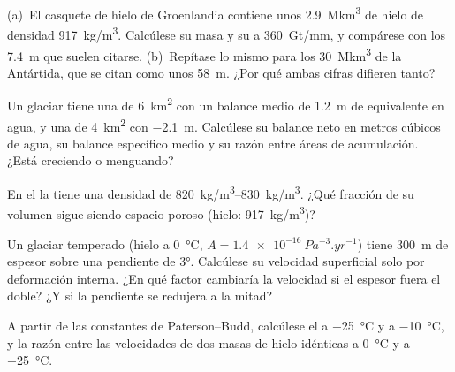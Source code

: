 \begin{exercise}[$\star$]\label{exo:b3:glaciology:2}
(a)~El casquete de hielo de Groenlandia contiene unos \qty{2.9}{\mega km^3} de hielo de
densidad \qty{917}{kg/m^3}. Calcúlese su masa y su  a
\qty{360}{Gt/mm}, y compárese con los \qty{7.4}{m} que suelen citarse.
(b)~Repítase lo mismo para los \qty{30}{\mega km^3} de la Antártida, que se citan como unos
\qty{58}{m}. ¿Por qué ambas cifras difieren tanto?
\end{exercise}

\begin{exercise}[$\star$]\label{exo:b3:glaciology:3}
Un glaciar tiene una  de \qty{6}{km^2} con un balance medio de
\qty{+1.2}{m} de equivalente en agua, y una  de \qty{4}{km^2} con
\qty{-2.1}{m}. Calcúlese su balance neto en metros cúbicos de agua, su balance
específico medio y su razón entre áreas de acumulación. ¿Está creciendo o
menguando?
\end{exercise}

\begin{exercise}[$\star$]\label{exo:b3:glaciology:4}
En el  la  tiene una densidad de \qtyrange{820}{830}{kg/m^3}.
¿Qué fracción de su volumen sigue siendo espacio poroso (hielo:
\qty{917}{kg/m^3})?
\end{exercise}

\begin{exercise}[$\star\star$]\label{exo:b3:glaciology:5}
Un glaciar temperado (hielo a \qty{0}{\celsius}, $A =
\qty{1.4e-16}{Pa^{-3}.yr^{-1}}$) tiene \qty{300}{m} de espesor sobre una pendiente de
\ang{3}. Calcúlese su velocidad superficial solo por deformación interna. ¿En qué
factor cambiaría la velocidad si el espesor fuera el doble? ¿Y si la pendiente
se redujera a la mitad?
\end{exercise}

\begin{exercise}[$\star\star$]\label{exo:b3:glaciology:6}
A partir de las constantes de Paterson--Budd, calcúlese el  a
\qty{-25}{\celsius} y a \qty{-10}{\celsius}, y la razón entre las velocidades de
dos masas de hielo idénticas a \qty{0}{\celsius} y a \qty{-25}{\celsius}.
\end{exercise}

